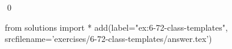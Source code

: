 
\begin{ex}
  \label{ex:6-72-class-templates}
  
  \qed
\end{ex}
\begin{python0}
from solutions import *
add(label="ex:6-72-class-templates",
    srcfilename='exercises/6-72-class-templates/answer.tex')
\end{python0}
